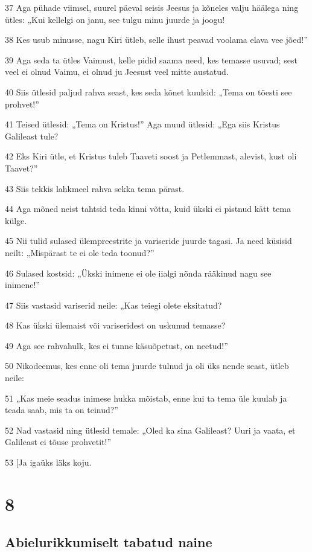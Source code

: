 \par 37 Aga pühade viimsel, suurel päeval seisis Jeesus ja kõneles valju häälega ning ütles: „Kui kellelgi on janu, see tulgu minu juurde ja joogu!
\par 38 Kes usub minusse, nagu Kiri ütleb, selle ihust peavad voolama elava vee jõed!”
\par 39 Aga seda ta ütles Vaimust, kelle pidid saama need, kes temasse usuvad; sest veel ei olnud Vaimu, ei olnud ju Jeesust veel mitte austatud.
\par 40 Siis ütlesid paljud rahva seast, kes seda kõnet kuulsid: „Tema on tõesti see prohvet!”
\par 41 Teised ütlesid: „Tema on Kristus!” Aga muud ütlesid: „Ega siis Kristus Galileast tule?
\par 42 Eks Kiri ütle, et Kristus tuleb Taaveti soost ja Petlemmast, alevist, kust oli Taavet?”
\par 43 Siis tekkis lahkmeel rahva sekka tema pärast.
\par 44 Aga mõned neist tahtsid teda kinni võtta, kuid ükski ei pistnud kätt tema külge.
\par 45 Nii tulid sulased ülempreestrite ja variseride juurde tagasi. Ja need küsisid neilt: „Mispärast te ei ole teda toonud?”
\par 46 Sulased kostsid: „Ükski inimene ei ole iialgi nõnda rääkinud nagu see inimene!”
\par 47 Siis vastasid variserid neile: „Kas teiegi olete eksitatud?
\par 48 Kas ükski ülemaist või variseridest on uskunud temasse?
\par 49 Aga see rahvahulk, kes ei tunne käsuõpetust, on neetud!”
\par 50 Nikodeemus, kes enne oli tema juurde tulnud ja oli üks nende seast, ütleb neile:
\par 51 „Kas meie seadus inimese hukka mõistab, enne kui ta tema üle kuulab ja teada saab, mis ta on teinud?”
\par 52 Nad vastasid ning ütlesid temale: „Oled ka sina Galileast? Uuri ja vaata, et Galileast ei tõuse prohvetit!”
\par 53 [Ja igaüks läks koju.


\chapter{8}

\section*{Abielurikkumiselt tabatud naine}

